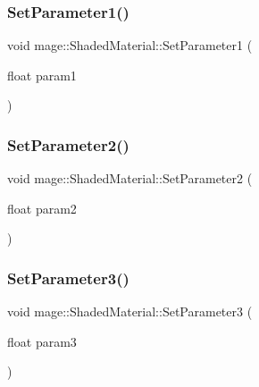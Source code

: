 \hypertarget{structmage_1_1_shaded_material_a16cc73293d4e18f3945e4a5818041ea7}{}\label{structmage_1_1_shaded_material_a16cc73293d4e18f3945e4a5818041ea7} 
\subsubsection{\texorpdfstring{Set\+Parameter1()}{SetParameter1()}}
{\footnotesize\ttfamily void mage\+::\+Shaded\+Material\+::\+Set\+Parameter1 (\begin{DoxyParamCaption}\item[{float}]{param1 }\end{DoxyParamCaption})\hspace{0.3cm}{\ttfamily [noexcept]}}

\hypertarget{structmage_1_1_shaded_material_a2b32f69b11604f20bf63653eed0f93b0}{}\label{structmage_1_1_shaded_material_a2b32f69b11604f20bf63653eed0f93b0} 
\subsubsection{\texorpdfstring{Set\+Parameter2()}{SetParameter2()}}
{\footnotesize\ttfamily void mage\+::\+Shaded\+Material\+::\+Set\+Parameter2 (\begin{DoxyParamCaption}\item[{float}]{param2 }\end{DoxyParamCaption})\hspace{0.3cm}{\ttfamily [noexcept]}}

\hypertarget{structmage_1_1_shaded_material_aa03eb95e8375fa28c05a837c7e5195b5}{}\label{structmage_1_1_shaded_material_aa03eb95e8375fa28c05a837c7e5195b5} 
\subsubsection{\texorpdfstring{Set\+Parameter3()}{SetParameter3()}}
{\footnotesize\ttfamily void mage\+::\+Shaded\+Material\+::\+Set\+Parameter3 (\begin{DoxyParamCaption}\item[{float}]{param3 }\end{DoxyParamCaption})\hspace{0.3cm}{\ttfamily [noexcept]}}

